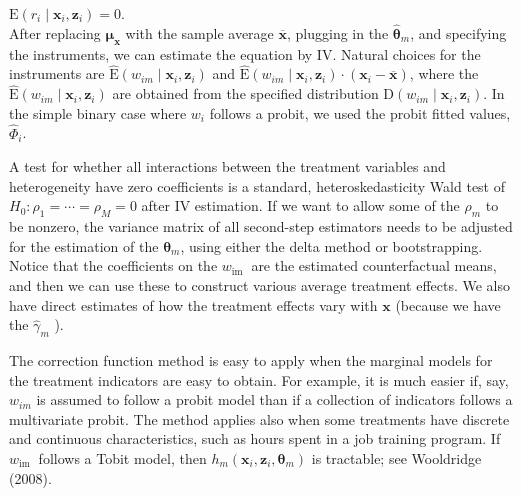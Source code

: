 \documentclass[10pt]{article}
\begin{document}
$\mathrm{E}\left(r_{i} \mid \mathbf{x}_{i}, \mathbf{z}_{i}\right)=0$.\\
After replacing $\boldsymbol{\mu}_{\mathbf{x}}$ with the sample average $\overline{\mathbf{x}}$, plugging in the $\hat{\boldsymbol{\theta}}_{m}$, and specifying the instruments, we can estimate the equation by IV. Natural choices for the instruments are $\hat{\mathrm{E}}\left(w_{i m} \mid \mathbf{x}_{i}, \mathbf{z}_{i}\right)$ and $\hat{\mathrm{E}}\left(w_{i m} \mid \mathbf{x}_{i}, \mathbf{z}_{i}\right) \cdot\left(\mathbf{x}_{i}-\overline{\mathbf{x}}\right)$, where the $\hat{\mathrm{E}}\left(w_{i m} \mid \mathbf{x}_{i}, \mathbf{z}_{i}\right)$ are obtained from the specified distribution $\mathrm{D}\left(w_{i m} \mid \mathbf{x}_{i}, \mathbf{z}_{i}\right)$. In the simple binary case where $w_{i}$ follows a probit, we used the probit fitted values, $\hat{\Phi}_{i}$.

A test for whether all interactions between the treatment variables and heterogeneity have zero coefficients is a standard, heteroskedasticity Wald test of $H_{0}: \rho_{1}=\cdots =\rho_{M}=0$ after IV estimation. If we want to allow some of the $\rho_{m}$ to be nonzero, the variance matrix of all second-step estimators needs to be adjusted for the estimation of the $\boldsymbol{\theta}_{m}$, using either the delta method or bootstrapping. Notice that the coefficients on the $w_{\text {im }}$ are the estimated counterfactual means, and then we can use these to construct various average treatment effects. We also have direct estimates of how the treatment effects vary with $\mathbf{x}$ (because we have the $\hat{\gamma}_{m}$ ).

The correction function method is easy to apply when the marginal models for the treatment indicators are easy to obtain. For example, it is much easier if, say, $w_{i m}$ is assumed to follow a probit model than if a collection of indicators follows a multivariate probit. The method applies also when some treatments have discrete and continuous characteristics, such as hours spent in a job training program. If $w_{\text {im }}$ follows a Tobit model, then $h_{m}\left(\mathbf{x}_{i}, \mathbf{z}_{i}, \boldsymbol{\theta}_{m}\right)$ is tractable; see Wooldridge (2008).
\end{document}
